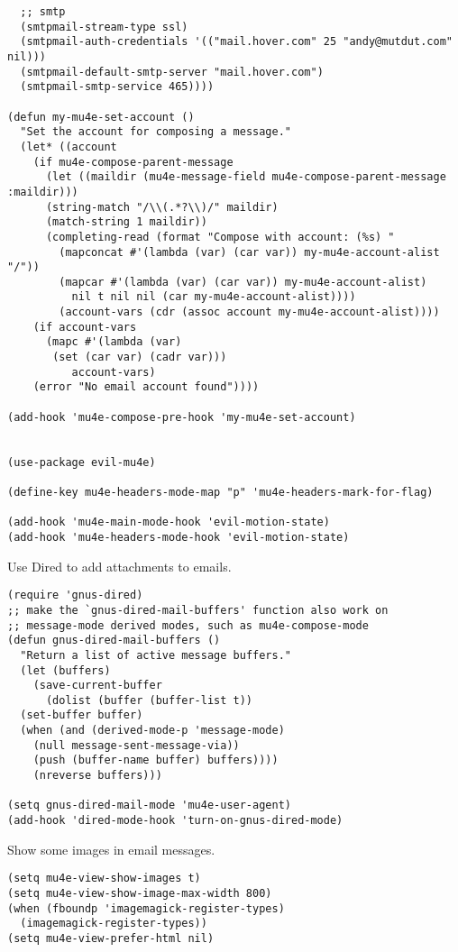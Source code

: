 \documentclass{article}
\begin{document}
\begin{verbatim}
  ;; smtp
  (smtpmail-stream-type ssl)
  (smtpmail-auth-credentials '(("mail.hover.com" 25 "andy@mutdut.com" nil)))
  (smtpmail-default-smtp-server "mail.hover.com")
  (smtpmail-smtp-service 465))))

(defun my-mu4e-set-account ()
  "Set the account for composing a message."
  (let* ((account
    (if mu4e-compose-parent-message
      (let ((maildir (mu4e-message-field mu4e-compose-parent-message :maildir)))
      (string-match "/\\(.*?\\)/" maildir)
      (match-string 1 maildir))
      (completing-read (format "Compose with account: (%s) "
        (mapconcat #'(lambda (var) (car var)) my-mu4e-account-alist "/"))
        (mapcar #'(lambda (var) (car var)) my-mu4e-account-alist)
          nil t nil nil (car my-mu4e-account-alist))))
        (account-vars (cdr (assoc account my-mu4e-account-alist))))
    (if account-vars
      (mapc #'(lambda (var)
       (set (car var) (cadr var)))
          account-vars)
    (error "No email account found"))))

(add-hook 'mu4e-compose-pre-hook 'my-mu4e-set-account)


(use-package evil-mu4e)

(define-key mu4e-headers-mode-map "p" 'mu4e-headers-mark-for-flag)

(add-hook 'mu4e-main-mode-hook 'evil-motion-state)
(add-hook 'mu4e-headers-mode-hook 'evil-motion-state)
\end{verbatim}


Use Dired to add attachments to emails.

\begin{verbatim}
(require 'gnus-dired)
;; make the `gnus-dired-mail-buffers' function also work on
;; message-mode derived modes, such as mu4e-compose-mode
(defun gnus-dired-mail-buffers ()
  "Return a list of active message buffers."
  (let (buffers)
    (save-current-buffer
      (dolist (buffer (buffer-list t))
  (set-buffer buffer)
  (when (and (derived-mode-p 'message-mode)
    (null message-sent-message-via))
    (push (buffer-name buffer) buffers))))
    (nreverse buffers)))

(setq gnus-dired-mail-mode 'mu4e-user-agent)
(add-hook 'dired-mode-hook 'turn-on-gnus-dired-mode)
\end{verbatim}

Show some images in email messages.

\begin{verbatim}
(setq mu4e-view-show-images t)
(setq mu4e-view-show-image-max-width 800)
(when (fboundp 'imagemagick-register-types)
  (imagemagick-register-types))
(setq mu4e-view-prefer-html nil)
\end{verbatim}
\end{document}
